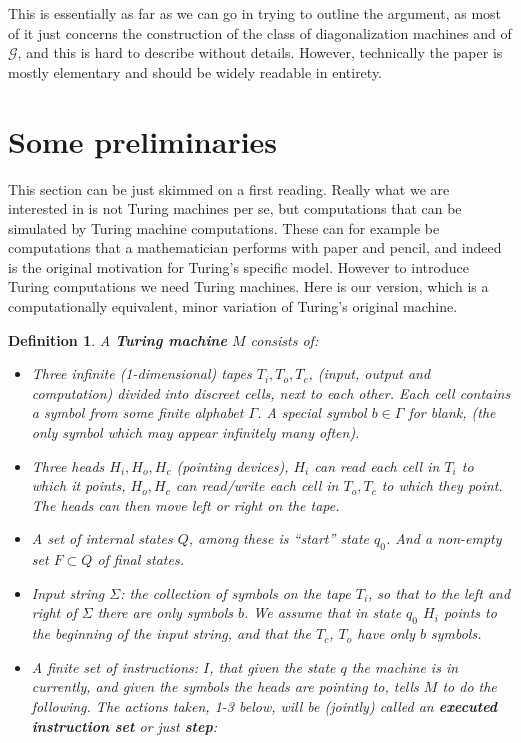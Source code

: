 \documentclass{amsart}  %
\numberwithin{equation}{section}
\newtheorem{definition}[equation]{Definition}
\theoremstyle{definition}
\theoremstyle{remark}
\begin{document}
{This is essentially as far as we can go in trying to outline the argument, as most of it just concerns the construction of the class of diagonalization machines and of $\mathcal{G}$, and this is hard to describe without details. However, technically the paper is mostly elementary and should be widely readable in entirety. 
\section {Some preliminaries} \label{sec:prelims}
This section can be just skimmed on a first reading.
Really what we are interested in is not Turing machines per se, but computations that can be simulated by Turing machine computations. These can for example be computations that a mathematician performs with paper and pencil, and indeed is the original motivation for Turing's specific model. However to introduce Turing computations we need Turing machines. Here is our version, which is a computationally equivalent, minor variation of Turing's original machine.
\begin{definition} \label{def:Machine} A \textbf{\emph{Turing machine}} $M$ consists of:
  \begin{itemize} 
     \item Three infinite (1-dimensional) tapes $T _{i}, T _{o}, T _{c}   $, (input, output and computation) divided into discreet cells, next to each other. Each cell contains a symbol from some finite alphabet $\Gamma$. A special symbol $b \in \Gamma$ for blank, (the only symbol which may appear infinitely many often).
     \item Three  heads $H _{i}, H _{o}, H _{c}   $ (pointing devices),  $H _{i} $ can read each cell in $T _{i} $ to which it points, $H _{o}, H _{c}  $ can read/write each cell in $T _{o}, T _{c}  $ to which they point.
        The heads can then move left or right on the tape.
     \item A set of internal states $Q$, among these is ``start'' state $q _{0} $. And a non-empty set $F \subset Q$ of final states.
\item Input string $\Sigma$: the collection of symbols on the tape $T _{i} $, so that to the left and right of $\Sigma$ there are only symbols $b$. We assume that in state $q _{0} $ $H _{i} $ points to the beginning of the input string, and that the $T _{c} $, $T _{o} $ have only $b$ symbols.
\item A finite set of instructions: $I$, that given the state $q$ the machine is in currently, and given the symbols the heads are pointing to, tells $M$ to do the following. The actions taken, 1-3 below, will be (jointly) called an \textbf{\emph{executed instruction set}} or just \textbf{\emph{step}}:

\end{itemize}
\end{definition}}
\end{document}
